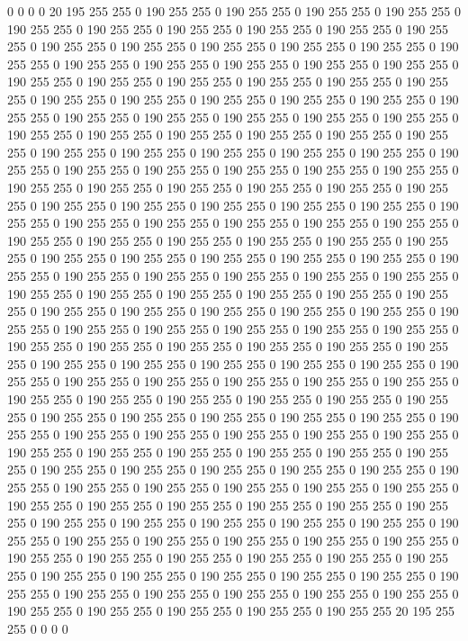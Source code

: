 0 0 0 0 20 195 255 255 0 190 255 255 0 190 255 255 0 190 255 255 0 190 255 255 0 190 255 255 0 190 255 255 0 190 255 255 0 190 255 255 0 190 255 255 0 190 255 255 0 190 255 255 0 190 255 255 0 190 255 255 0 190 255 255 0 190 255 255 0 190 255 255 0 190 255 255 0 190 255 255 0 190 255 255 0 190 255 255 0 190 255 255 0 190 255 255 0 190 255 255 0 190 255 255 0 190 255 255 0 190 255 255 0 190 255 255 0 190 255 255 0 190 255 255 0 190 255 255 0 190 255 255 0 190 255 255 0 190 255 255 0 190 255 255 0 190 255 255 0 190 255 255 0 190 255 255 0 190 255 255 0 190 255 255 0 190 255 255 0 190 255 255 0 190 255 255 0 190 255 255 0 190 255 255 0 190 255 255 0 190 255 255 0 190 255 255 0 190 255 255 
0 190 255 255 0 190 255 255 0 190 255 255 0 190 255 255 0 190 255 255 0 190 255 255 0 190 255 255 0 190 255 255 0 190 255 255 0 190 255 255 0 190 255 255 0 190 255 255 0 190 255 255 0 190 255 255 0 190 255 255 0 190 255 255 0 190 255 255 0 190 255 255 0 190 255 255 0 190 255 255 0 190 255 255 0 190 255 255 0 190 255 255 0 190 255 255 0 190 255 255 0 190 255 255 0 190 255 255 0 190 255 255 0 190 255 255 0 190 255 255 0 190 255 255 0 190 255 255 0 190 255 255 0 190 255 255 0 190 255 255 0 190 255 255 0 190 255 255 0 190 255 255 0 190 255 255 0 190 255 255 0 190 255 255 0 190 255 255 0 190 255 255 0 190 255 255 0 190 255 255 0 190 255 255 0 190 255 255 0 190 255 255 0 190 255 255 0 190 255 255 
0 190 255 255 0 190 255 255 0 190 255 255 0 190 255 255 0 190 255 255 0 190 255 255 0 190 255 255 0 190 255 255 0 190 255 255 0 190 255 255 0 190 255 255 0 190 255 255 0 190 255 255 0 190 255 255 0 190 255 255 0 190 255 255 0 190 255 255 0 190 255 255 0 190 255 255 0 190 255 255 0 190 255 255 0 190 255 255 0 190 255 255 0 190 255 255 0 190 255 255 0 190 255 255 0 190 255 255 0 190 255 255 0 190 255 255 0 190 255 255 0 190 255 255 0 190 255 255 0 190 255 255 0 190 255 255 0 190 255 255 0 190 255 255 0 190 255 255 0 190 255 255 0 190 255 255 0 190 255 255 0 190 255 255 0 190 255 255 0 190 255 255 0 190 255 255 0 190 255 255 0 190 255 255 0 190 255 255 0 190 255 255 0 190 255 255 0 190 255 255 
0 190 255 255 0 190 255 255 0 190 255 255 0 190 255 255 0 190 255 255 0 190 255 255 0 190 255 255 0 190 255 255 0 190 255 255 0 190 255 255 0 190 255 255 0 190 255 255 0 190 255 255 0 190 255 255 0 190 255 255 0 190 255 255 0 190 255 255 0 190 255 255 0 190 255 255 0 190 255 255 0 190 255 255 0 190 255 255 0 190 255 255 0 190 255 255 0 190 255 255 0 190 255 255 0 190 255 255 0 190 255 255 0 190 255 255 0 190 255 255 0 190 255 255 0 190 255 255 0 190 255 255 0 190 255 255 0 190 255 255 0 190 255 255 0 190 255 255 0 190 255 255 0 190 255 255 0 190 255 255 0 190 255 255 0 190 255 255 0 190 255 255 0 190 255 255 0 190 255 255 0 190 255 255 0 190 255 255 0 190 255 255 20 195 255 255 0 0 0 0 
